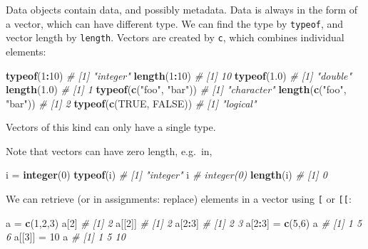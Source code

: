 \documentclass[]{book}
\newenvironment{Shaded}{\begin{snugshade}}{\end{snugshade}}
\newcommand{\CommentTok}[1]{\textcolor[rgb]{0.56,0.35,0.01}{\textit{#1}}}
\newcommand{\DecValTok}[1]{\textcolor[rgb]{0.00,0.00,0.81}{#1}}
\newcommand{\FloatTok}[1]{\textcolor[rgb]{0.00,0.00,0.81}{#1}}
\newcommand{\KeywordTok}[1]{\textcolor[rgb]{0.13,0.29,0.53}{\textbf{#1}}}
\newcommand{\NormalTok}[1]{#1}
\newcommand{\OperatorTok}[1]{\textcolor[rgb]{0.81,0.36,0.00}{\textbf{#1}}}
\newcommand{\OtherTok}[1]{\textcolor[rgb]{0.56,0.35,0.01}{#1}}
\newcommand{\StringTok}[1]{\textcolor[rgb]{0.31,0.60,0.02}{#1}}
\begin{document}
Data objects contain data, and possibly metadata. Data is always
in the form of a vector, which can have different type. We can
find the type by \texttt{typeof}, and vector length by \texttt{length}. Vectors
are created by \texttt{c}, which combines individual elements:

\begin{Shaded}
\begin{Highlighting}[]
\KeywordTok{typeof}\NormalTok{(}\DecValTok{1}\OperatorTok{:}\DecValTok{10}\NormalTok{)}
\CommentTok{# [1] "integer"}
\KeywordTok{length}\NormalTok{(}\DecValTok{1}\OperatorTok{:}\DecValTok{10}\NormalTok{)}
\CommentTok{# [1] 10}
\KeywordTok{typeof}\NormalTok{(}\FloatTok{1.0}\NormalTok{)}
\CommentTok{# [1] "double"}
\KeywordTok{length}\NormalTok{(}\FloatTok{1.0}\NormalTok{)}
\CommentTok{# [1] 1}
\KeywordTok{typeof}\NormalTok{(}\KeywordTok{c}\NormalTok{(}\StringTok{"foo"}\NormalTok{, }\StringTok{"bar"}\NormalTok{))}
\CommentTok{# [1] "character"}
\KeywordTok{length}\NormalTok{(}\KeywordTok{c}\NormalTok{(}\StringTok{"foo"}\NormalTok{, }\StringTok{"bar"}\NormalTok{))}
\CommentTok{# [1] 2}
\KeywordTok{typeof}\NormalTok{(}\KeywordTok{c}\NormalTok{(}\OtherTok{TRUE}\NormalTok{, }\OtherTok{FALSE}\NormalTok{))}
\CommentTok{# [1] "logical"}
\end{Highlighting}
\end{Shaded}

Vectors of this kind can only have a single type.

Note that vectors can have zero length, e.g.~in,

\begin{Shaded}
\begin{Highlighting}[]
\NormalTok{i =}\StringTok{ }\KeywordTok{integer}\NormalTok{(}\DecValTok{0}\NormalTok{)}
\KeywordTok{typeof}\NormalTok{(i)}
\CommentTok{# [1] "integer"}
\NormalTok{i}
\CommentTok{# integer(0)}
\KeywordTok{length}\NormalTok{(i)}
\CommentTok{# [1] 0}
\end{Highlighting}
\end{Shaded}

We can retrieve (or in assignments: replace) elements in a vector
using \texttt{{[}} or \texttt{{[}{[}}:

\begin{Shaded}
\begin{Highlighting}[]
\NormalTok{a =}\StringTok{ }\KeywordTok{c}\NormalTok{(}\DecValTok{1}\NormalTok{,}\DecValTok{2}\NormalTok{,}\DecValTok{3}\NormalTok{)}
\NormalTok{a[}\DecValTok{2}\NormalTok{]}
\CommentTok{# [1] 2}
\NormalTok{a[[}\DecValTok{2}\NormalTok{]]}
\CommentTok{# [1] 2}
\NormalTok{a[}\DecValTok{2}\OperatorTok{:}\DecValTok{3}\NormalTok{]}
\CommentTok{# [1] 2 3}
\NormalTok{a[}\DecValTok{2}\OperatorTok{:}\DecValTok{3}\NormalTok{] =}\StringTok{ }\KeywordTok{c}\NormalTok{(}\DecValTok{5}\NormalTok{,}\DecValTok{6}\NormalTok{)}
\NormalTok{a}
\CommentTok{# [1] 1 5 6}
\NormalTok{a[[}\DecValTok{3}\NormalTok{]] =}\StringTok{ }\DecValTok{10}
\NormalTok{a}
\CommentTok{# [1]  1  5 10}
\end{Highlighting}
\end{Shaded}
\end{document}
